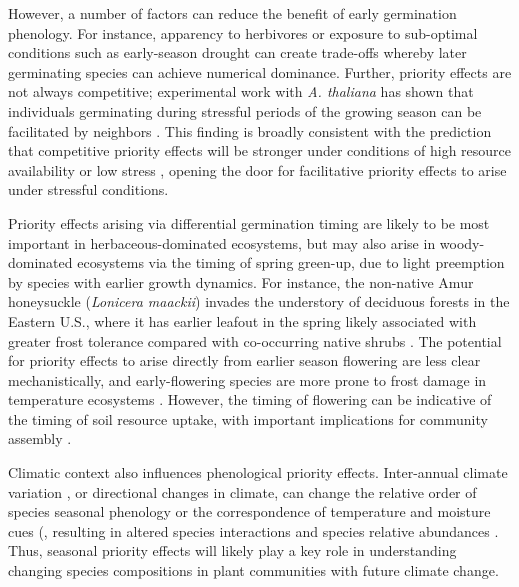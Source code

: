 \documentclass[11pt]{article}
\begin{document}
However, a number of factors can reduce the benefit of early germination phenology. For instance, apparency to herbivores \citep{waterton2016trade} or exposure to sub-optimal conditions such as early-season drought \citep{wainwright2012seasonal} can create trade-offs whereby later germinating species can achieve numerical dominance. Further, priority effects are not always competitive; experimental work with \textit{A. thaliana} has shown that individuals germinating during stressful periods of the growing season can be facilitated by neighbors \citep{leverett2017germination}. This finding is broadly consistent with the prediction that competitive priority effects will be stronger under conditions of high resource availability or low stress \citep{vannette2014historical}, opening the door for facilitative priority effects to arise under stressful conditions.

Priority effects arising via differential germination timing are likely to be most important in herbaceous-dominated ecosystems, but may also arise in woody-dominated ecosystems via the timing of spring green-up, due to light preemption by species with earlier growth dynamics. For instance, the non-native Amur honeysuckle (\textit{Lonicera maackii}) invades the understory of deciduous forests in the Eastern U.S., where it has earlier leafout in the spring likely associated with greater frost tolerance compared with co-occurring native shrubs \citep{mcewan2009leaf}. The potential for priority effects to arise directly from earlier season flowering are less clear mechanistically, and early-flowering species are more prone to frost damage in temperature ecosystems \citep{inouye2008effects}. However, the timing of flowering can be indicative of the timing of soil resource uptake, with important implications for community assembly \citep{gulmon1983phenology,seabloom2003invasion}.

Climatic context also influences phenological priority effects. Inter-annual climate variation \citep{levine2011seasonal}, or directional changes in climate, can change the relative order of species seasonal phenology or the correspondence of temperature and moisture cues (\cite{kimball2010contemporary}, resulting in altered species interactions and species relative abundances \citep{thomson2017between,kimball2010contemporary,buonaiuto2023contrasting}. Thus, seasonal priority effects will likely play a key role in understanding changing species compositions in plant communities with future climate change.
\end{document}
